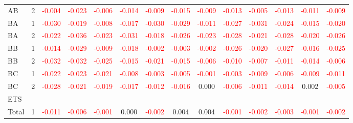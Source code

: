 \begin{table}[H]
{\begin{tabular}{llcccccccccccc}
AB & 2 & \textcolor{red}{-0.004} & \textcolor{red}{-0.023} & \textcolor{red}{-0.006} & \textcolor{red}{-0.014} & \textcolor{red}{-0.009} & \textcolor{red}{-0.015} & \textcolor{red}{-0.009} & \textcolor{red}{-0.013} & \textcolor{red}{-0.005} & \textcolor{red}{-0.013} & \textcolor{red}{-0.011} & \textcolor{red}{-0.009}\\
BA & 1 & \textcolor{red}{-0.030} & \textcolor{red}{-0.019} & \textcolor{red}{-0.008} & \textcolor{red}{-0.017} & \textcolor{red}{-0.030} & \textcolor{red}{-0.029} & \textcolor{red}{-0.011} & \textcolor{red}{-0.027} & \textcolor{red}{-0.031} & \textcolor{red}{-0.024} & \textcolor{red}{-0.015} & \textcolor{red}{-0.020}\\
BA & 2 & \textcolor{red}{-0.022} & \textcolor{red}{-0.036} & \textcolor{red}{-0.023} & \textcolor{red}{-0.031} & \textcolor{red}{-0.018} & \textcolor{red}{-0.026} & \textcolor{red}{-0.023} & \textcolor{red}{-0.028} & \textcolor{red}{-0.021} & \textcolor{red}{-0.028} & \textcolor{red}{-0.020} & \textcolor{red}{-0.026}\\
BB & 1 & \textcolor{red}{-0.014} & \textcolor{red}{-0.029} & \textcolor{red}{-0.009} & \textcolor{red}{-0.018} & \textcolor{red}{-0.002} & \textcolor{red}{-0.003} & \textcolor{red}{-0.002} & \textcolor{red}{-0.026} & \textcolor{red}{-0.020} & \textcolor{red}{-0.027} & \textcolor{red}{-0.016} & \textcolor{red}{-0.025}\\
BB & 2 & \textcolor{red}{-0.032} & \textcolor{red}{-0.032} & \textcolor{red}{-0.025} & \textcolor{red}{-0.015} & \textcolor{red}{-0.021} & \textcolor{red}{-0.015} & \textcolor{red}{-0.006} & \textcolor{red}{-0.010} & \textcolor{red}{-0.007} & \textcolor{red}{-0.011} & \textcolor{red}{-0.014} & \textcolor{red}{-0.006}\\
BC & 1 & \textcolor{red}{-0.022} & \textcolor{red}{-0.023} & \textcolor{red}{-0.021} & \textcolor{red}{-0.008} & \textcolor{red}{-0.003} & \textcolor{red}{-0.005} & \textcolor{red}{-0.001} & \textcolor{red}{-0.003} & \textcolor{red}{-0.009} & \textcolor{red}{-0.006} & \textcolor{red}{-0.009} & \textcolor{red}{-0.011}\\
BC & 2 & \textcolor{red}{-0.028} & \textcolor{red}{-0.021} & \textcolor{red}{-0.019} & \textcolor{red}{-0.017} & \textcolor{red}{-0.012} & \textcolor{red}{-0.016} & 0.000 & \textcolor{red}{-0.006} & \textcolor{red}{-0.011} & \textcolor{red}{-0.014} & 0.002 & \textcolor{red}{-0.005}\\
\hline
ETS &  &  &  &  &  &  &  &  &  &  &  &  & \\
\hline
Total & 1 & \textcolor{red}{-0.011} & \textcolor{red}{-0.006} & \textcolor{red}{-0.001} & 0.000 & \textcolor{red}{-0.002} & 0.004 & 0.004 & \textcolor{red}{-0.001} & \textcolor{red}{-0.002} & \textcolor{red}{-0.003} & \textcolor{red}{-0.001} & \textcolor{red}{-0.002}\\

\end{tabular}}
\end{table}
